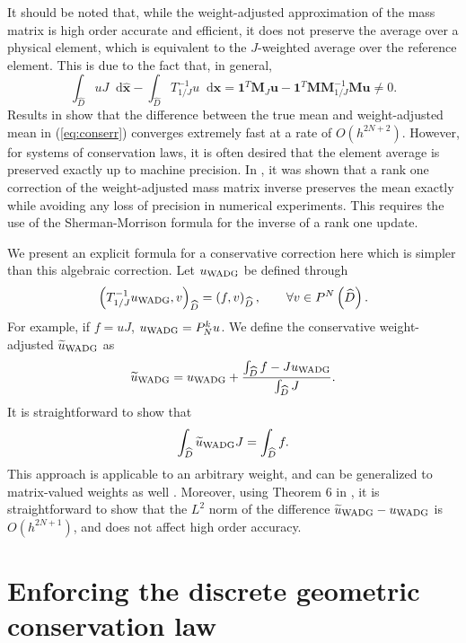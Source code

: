 \documentclass[preprint,10pt]{article}
\theoremstyle{definition}
\theoremstyle{lemma}
\theoremstyle{theorem}
\theoremstyle{assumption}
\renewcommand{\hat}{\widehat}
\renewcommand{\tilde}{\widetilde}
\newcommand{\LRp}[1]{\left( #1 \right)}
\newcommand*\diff[1]{\mathop{}\!{\mathrm{d}#1}} %
\begin{document}
{It should be noted that, while the weight-adjusted approximation of the mass matrix is high order accurate and efficient, it does not preserve the average over a physical element, which is equivalent to the $J$-weighted average over the reference element.  This is due to the fact that, in general,
\begin{equation}
\int_{\hat{D}}u J \diff{\hat{\bm{x}}} - \int_{\hat{D}} T_{1/J}^{-1}u \diff{\hat{\bm{x}}} = \bm{1}^T\bm{M}_J\bm{u} - \bm{1}^T\bm{M}\bm{M}_{1/J}^{-1}\bm{M}\bm{u} \neq 0.  
\label{eq:conserr}
\end{equation}
Results in \cite{chan2016weight1} show that the difference between the true mean and weight-adjusted mean in (\ref{eq:conserr}) converges extremely fast at a rate of $O(h^{2N+2})$.  However, for systems of conservation laws, it is often desired that the element average is preserved exactly up to machine precision.  In \cite{chan2016weight2}, it was shown that a rank one correction of the weight-adjusted mass matrix inverse preserves the mean exactly while avoiding any loss of precision in numerical experiments.  This requires the use of the Sherman-Morrison formula for the inverse of a rank one update.  

We present an explicit formula for a conservative correction here which is simpler than this algebraic correction.  Let $u_{\rm WADG}$ be defined through 
\[
\LRp{T_{1/J}^{-1}u_{\rm WADG},v}_{\hat{D}} = \LRp{f,v}_{\hat{D}}, \qquad \forall v \in P^N\LRp{\hat{D}}.
\]
For example, if $f = u J$, $u_{\rm WADG} = P^k_N u$.  We define the conservative weight-adjusted $\tilde{u}_{\rm WADG}$ as
\[
\tilde{u}_{\rm WADG} = u_{\rm WADG} + \frac{\int_{\hat{D}} f - J u_{\rm WADG}}{\int_{\hat{D}} J}.  
\]
It is straightforward to show that 
\[
\int_{\hat{D}}\tilde{u}_{\rm WADG}J = \int_{\hat{D}} f.
\]
This approach is applicable to an arbitrary weight, and can be generalized to matrix-valued weights as well \cite{chan2017weight}.  Moreover, using Theorem 6 in \cite{chan2016weight1}, it is straightforward to show that the $L^2$ norm of the difference $\tilde{u}_{\rm WADG} - u_{\rm WADG}$ is $O(h^{2N+1})$, and does not affect high order accuracy.  

\section{Enforcing the discrete geometric conservation law}

}
\end{document}
